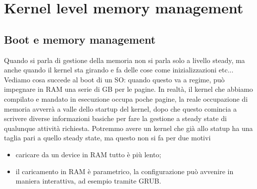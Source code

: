 \documentclass[12pt, oneside]{extbook}
\begin{document}
\chapter{Kernel level memory management}
\section{Boot e memory management}
Quando si parla di gestione della memoria non si parla solo a livello steady, ma anche quando il kernel sta girando e fa delle cose come inizializzazioni etc...\\ Vediamo cosa succede al boot di un SO: quando questo va a regime, può impegnare in RAM una serie di GB per le pagine. In realtà, il kernel che abbiamo compilato e mandato in esecuzione occupa poche pagine, la reale occupazione di memoria avverrà a valle dello startup del kernel, dopo che questo comincia a scrivere diverse informazioni basiche per fare la gestione a steady state di qualunque attività richiesta. Potremmo avere un kernel che già allo statup ha una taglia pari a quello steady state, ma questo non si fa per due motivi
\begin{itemize}
\item caricare da un device in RAM tutto è più lento;
\item il caricamento in RAM è parametrico, la configurazione può avvenire in maniera interattiva, ad esempio tramite GRUB.
\end{itemize}
\end{document}
